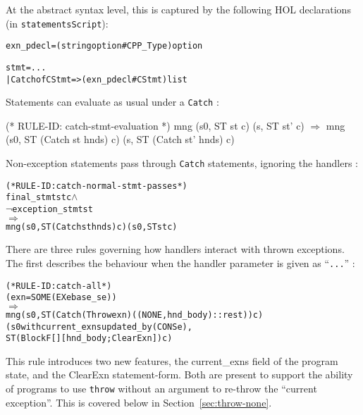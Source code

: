 \documentclass[11pt]{article}
\begin{document}
At the abstract syntax level, this is captured by the following HOL
declarations (in \texttt{statementsScript}):
\begin{alltt}
   exn_pdecl = (string option # CPP_Type) option

   stmt = ...
        | Catch of CStmt => (exn_pdecl # CStmt) list
\end{alltt}

\bigskip
\noindent
Statements can evaluate as usual under a \texttt{Catch}
:
%
%
\begin{stdrule}
(* RULE-ID: catch-stmt-evaluation *)
     mng (s0, ST st c) (s, ST st' c)
   \(\Rightarrow\)
     mng (s0, ST (Catch st hnds) c) (s, ST (Catch st' hnds) c)
\end{stdrule}
Non-exception statements pass through \texttt{Catch} statements,
ignoring the handlers :
\begin{center}
\begin{minipage}{\textwidth}
%
\begin{alltt}
(* RULE-ID: catch-normal-stmt-passes *)
     final_stmt st c \(\land\)
     \(\neg\)exception_stmt st
   \(\Rightarrow\)
     mng (s0, ST (Catch st hnds) c) (s0, ST st c)
\end{alltt}
\end{minipage}
\end{center}

There are three rules governing how handlers interact with thrown
exceptions.  The first describes the behaviour when the handler
parameter is given as ``\texttt{...}'' :
\begin{center}
\begin{minipage}{\textwidth}
%
\begin{alltt}
(* RULE-ID: catch-all *)
     (exn = SOME (EX e base_se))
   \(\Rightarrow\)
     mng (s0, ST (Catch (Throw exn) ((NONE, hnd_body) :: rest)) c)
         (s0 with current_exns updated_by (CONS e),
          ST (Block F [] [hnd_body; ClearExn]) c)
\end{alltt}
\end{minipage}
\end{center}
%
%
This rule introduces two new features, the \textsf{current\_exns}
field of the program state, and the \textsf{ClearExn} statement-form.
Both are present to support the ability of programs to use
\texttt{throw} without an argument to re-throw the ``current
exception''.  This is covered below in Section~\ref{sec:throw-none}.
\end{document}
